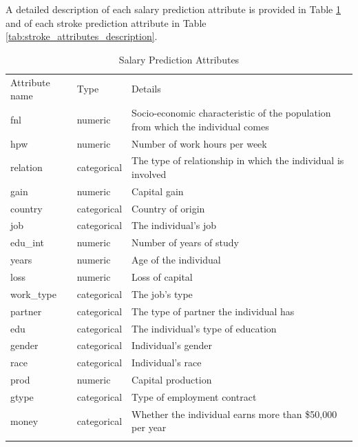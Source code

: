 \documentclass[runningheads]{paper}
\begin{document}
A detailed description of each salary prediction attribute is provided in Table
\ref{tab:salary_attributes_description} and of each stroke  prediction attribute
in Table \ref{tab:stroke_attributes_description}.

\begin{center}
    \begin{longtable}{ |>{\centering\arraybackslash}p{3cm}||>{\centering\arraybackslash}p{2cm}|>{\centering\arraybackslash}p{6cm}| }
        \hline
        \multicolumn{3}{|c|}{List of all attributes in the Salary Prediction dataset} \\
        \hline
        Attribute name & Type & Details \\
        \hline
        fnl & numeric & Socio-economic characteristic of the population from which the individual comes \\
        \hline
        hpw & numeric & Number of work hours per week \\
        \hline
        relation & categorical & The type of relationship in which the individual is involved \\
        \hline
        gain & numeric & Capital gain \\
        \hline
        country & categorical & Country of origin \\
        \hline
        job & categorical & The individual's job \\
        \hline
        edu\_int & numeric & Number of years of study \\
        \hline
        years & numeric & Age of the individual \\
        \hline
        loss & numeric & Loss of capital \\
        \hline
        work\_type & categorical & The job's type \\
        \hline
        partner & categorical & The type of partner the individual has \\
        \hline
        edu & categorical & The individual's type of education \\
        \hline
        gender & categorical & Individual's gender \\
        \hline
        race & categorical & Individual's race \\
        \hline
        prod & numeric & Capital production \\
        \hline
        gtype & categorical & Type of employment contract \\
        \hline
        money & categorical & Whether the individual earns more than \$50,000 per year \\
        \hline
        \caption{Salary Prediction Attributes}
        \label{tab:salary_attributes_description}
   \end{longtable}
\end{center}
\end{document}
